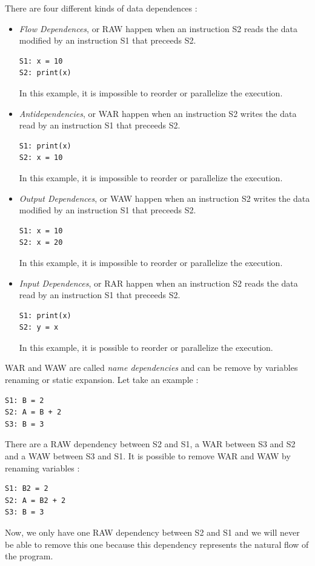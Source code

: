There are four different kinds of data dependences :
\begin{itemize}
\item \emph{Flow Dependences}, or \ac{RAW} happen when an instruction S2 reads the data modified by an instruction S1 that preceeds S2. 
\begin{lstlisting}[frame=single]
S1: x = 10
S2: print(x)
\end{lstlisting}
In this example, it is impossible to reorder or parallelize the execution.

\item \emph{Antidependencies}, or \ac{WAR} happen when an instruction S2 writes the data read by an instruction S1 that preceeds S2.
\begin{lstlisting}[frame=single]
S1: print(x)
S2: x = 10
\end{lstlisting}
In this example, it is impossible to reorder or parallelize the execution.

\item \emph{Output Dependences}, or \ac{WAW} happen when an instruction S2 writes the data modified by an instruction S1 that preceeds S2.
\begin{lstlisting}[frame=single]
S1: x = 10
S2: x = 20
\end{lstlisting}
In this example, it is impossible to reorder or parallelize the execution.

\item \emph{Input Dependences}, or \ac{RAR} happen when an instruction S2 reads the data read by an instruction S1 that preceeds S2. 
\begin{lstlisting}[frame=single]
S1: print(x)
S2: y = x
\end{lstlisting}
In this example, it is possible to reorder or parallelize the execution.
\end{itemize}

\ac{WAR} and \ac{WAW} are called \emph{name dependencies} and can be remove by variables renaming or static expansion. Let take an example :
\begin{lstlisting}[frame=single]
S1: B = 2
S2: A = B + 2
S3: B = 3
\end{lstlisting}

There are a \ac{RAW} dependency between S2 and S1, a \ac{WAR} between S3 and S2 and a \ac{WAW} between S3 and S1. It is possible to remove \ac{WAR} and \ac{WAW} by renaming variables :
\begin{lstlisting}[frame=single]
S1: B2 = 2
S2: A = B2 + 2
S3: B = 3
\end{lstlisting}
Now, we only have one \ac{RAW} dependency between S2 and S1 and we will never be able to remove this one because this dependency represents the natural flow of the program.

